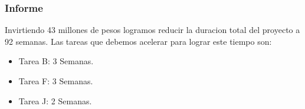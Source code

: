\begin{homeworkProblem}
\subsubsection{Informe}
Invirtiendo 43 millones de pesos logramos reducir la duracion total del proyecto a 92 semanas. Las tareas que debemos acelerar para lograr este tiempo son:
\begin{itemize}
    \item Tarea B: 3 Semanas.
    \item Tarea F: 3 Semanas.
    \item Tarea J: 2 Semanas.
\end{itemize}

\end{homeworkProblem}
